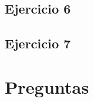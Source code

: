 \documentclass[10pt, a4paper]{article}
\begin{document}
	  	\subsection{Ejercicio 6}
	  		\begin{minipage}{\linewidth}
	  			
	  		\end{minipage}
	  	
	  	\pagebreak
	  	\subsection{Ejercicio 7}
	  			
		  	\pagebreak
	\section{Preguntas}
	  	
\end{document}

